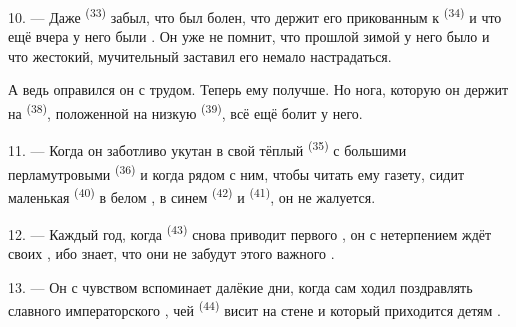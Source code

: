 \VUsaut{4.2mm}
\VUsaut{3.0mm}

10. --- Даже  \textsuperscript{(33)} забыл, что был болен, что
 держит его прикованным к  \textsuperscript{(34)}
и что ещё вчера у него были . Он уже не помнит, что
прошлой зимой у него было  и что жестокий,
мучительный  заставил его немало настрадаться.

А ведь оправился он с трудом. Теперь ему получше. Но нога, которую он
держит на  \textsuperscript{(38)}, положенной на низкую
 \textsuperscript{(39)}, всё ещё болит у него.

11. --- Когда он заботливо укутан в свой тёплый 
\textsuperscript{(35)} с большими перламутровыми 
\textsuperscript{(36)} и когда рядом с ним, чтобы читать ему газету, сидит
маленькая  \textsuperscript{(40)} в белом , в
синем  \textsuperscript{(42)} и 
\textsuperscript{(41)}, он не жалуется.

12. --- Каждый год, когда  \textsuperscript{(43)} снова
приводит  первого , он с нетерпением ждёт
своих , ибо знает, что они не забудут этого важного
.

13. --- Он с чувством вспоминает далёкие дни, когда сам ходил
поздравлять славного императорского , чей 
\textsuperscript{(44)} висит на стене и который приходится детям
.
\VUsaut{6.0mm}
\VUfilet{22mm}
